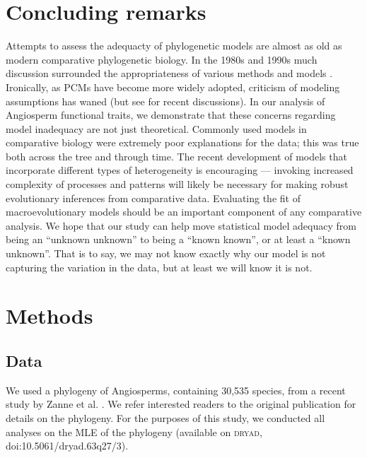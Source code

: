 \documentclass[a4paper,12pt]{article}
\begin{document}
\section{Concluding remarks}
Attempts to assess the adequacty of phylogenetic models are almost as old as modern comparative phylogenetic biology.  In the 1980s and 1990s much discussion surrounded the appropriateness of various methods and models \citep{Felsenstein1985, Felsenstein1988, HarveyPagel1991, Garland1992, Diaz1996, Price1997, Garland1999, GarlandIves2000}. Ironically, as PCMs have become more widely adopted, criticism of modeling assumptions has waned (but see \citep{Felsenstein2012, Hansen2012} for recent discussions). In our analysis of Angiosperm functional traits, we demonstrate that these concerns regarding model inadequacy are not just theoretical. Commonly used models in comparative biology were extremely poor explanations for the data; this was true both across the tree and through time. The recent development of models that incorporate different types of heterogeneity is encouraging --- invoking increased complexity of processes and patterns will likely be necessary for making robust evolutionary inferences from comparative data. Evaluating the fit of macroevolutionary models should be an important component of any comparative analysis. We hope that our study can help move statistical model adequacy from being an ``unknown unknown''  to being a ``known known'', or at least a ``known unknown''. That is to say, we may not know exactly why our model is not capturing the variation in the data, but at least we will know it is not.

\section{Methods}

\subsection{Data}
We used a phylogeny of Angiosperms, containing 30,535 species, from a recent study by Zanne et al. \citep{Zanne2013}. We refer interested readers to the original publication for details on the phylogeny. For the purposes of this study, we conducted all analyses on the MLE of the phylogeny (available on \textsc{dryad}, doi:10.5061/dryad.63q27/3).
\end{document}
